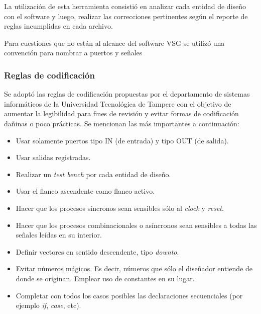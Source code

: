 La utilización de esta herramienta consistió en analizar cada entidad de diseño con el software y luego, realizar las correcciones pertinentes según el reporte de reglas incumplidas en cada archivo.

Para cuestiones que no están al alcance del software VSG se utilizó una convención para nombrar a puertos y señales

\subsubsection{Reglas de codificación}
Se adoptó las reglas de codificación propuestas por el departamento de sistemas informáticos de la Universidad Tecnológica de Tampere con el objetivo de aumentar la legibilidad para fines de revisión y evitar formas de codificación dañinas o poco prácticas. Se mencionan las más importantes a continuación:

\begin{itemize}
\item Usar solamente puertos tipo IN (de entrada) y tipo OUT (de salida).
\item Usar salidas registradas.
\item Realizar un \textit{test bench} por cada entidad de diseño.
\item Usar el flanco ascendente como flanco activo.
\item Hacer que los procesos síncronos sean sensibles sólo al \textit{clock} y \textit{reset}.
\item Hacer que los procesos combinacionales o asíncronos sean sensibles a todas las señales leídas en su interior.
\item Definir vectores en sentido descendente, tipo \textit{downto}.
\item Evitar números mágicos. Es decir, números que sólo el diseñador entiende de donde se originan. Emplear uso de constantes en su lugar.
\item Completar con todos los casos posibles las declaraciones secuenciales (por ejemplo \textit{if}, \textit{case}, etc).
\end{itemize}

